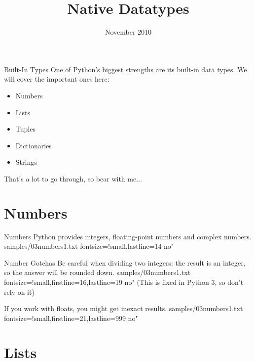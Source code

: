 \documentclass{pyslides}
\title{Native Datatypes}
\date{November 2010}
\begin{document}
\begin{frame}\titlepage\end{frame}

\section{}

\begin{frame}[fragile]{Built-In Types}
One of Python's biggest strengths are its built-in data types. We will cover the important ones here:
\begin{itemize}
\item Numbers
\item Lists
\item Tuples
\item Dictionaries
\item Strings
\end{itemize}

\bigskip

That's a lot to go through, so bear with me...

\end{frame}

\section{Numbers}

\begin{frame}[fragile]{Numbers}
Python provides integers, floating-point numbers and complex numbers.
 samples/03numbers1.txt fontsize=!small,lastline=14 no"
\end{frame}

\begin{frame}[fragile]{Number Gotchas}
Be careful when dividing two integers: the result is an integer, so the answer will be rounded down.
 samples/03numbers1.txt fontsize=!small,firstline=16,lastline=19 no"
(This is fixed in Python 3, so don't rely on it)

\bigskip

If you work with floats, you might get inexact results.
 samples/03numbers1.txt fontsize=!small,firstline=21,lastline=999 no"
\end{frame}

\section{Lists}
\end{document}
